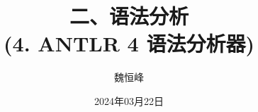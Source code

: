 \documentclass[]{beamer}
\title[语法分析]{二、语法分析 \\ (4. ANTLR 4 语法分析器)}
\author[魏恒峰]{\large 魏恒峰}
\institute{hfwei@nju.edu.cn}
\date{2024年03月22日}
\begin{document}
\maketitle






\thankyou{}

\end{document}
